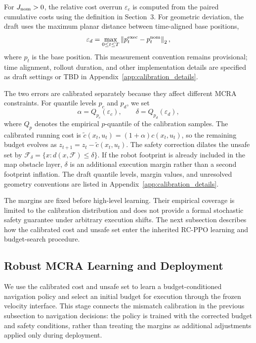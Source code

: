 \documentclass{article}
\begin{document}
For $J_{\rm nom}>0$, the relative cost overrun $\varepsilon_c$ is computed from
the paired cumulative costs using the definition in Section~3. For geometric
deviation, the draft uses the maximum planar distance between time-aligned base
positions,
\begin{equation}
\varepsilon_d=\max_{0\leq t\leq T} \left\|p_t^{\rm exec}-p_t^{\rm nom}\right\|_2,
\end{equation}
where $p_t$ is the base position. This measurement convention remains provisional;
time alignment, rollout duration, and other implementation details are specified
as draft settings or \textsc{TBD} in Appendix~\ref{app:calibration_details}.

The two errors are calibrated separately because they affect different MCRA
constraints. For quantile levels $p_c$ and $p_d$, we set
\begin{equation}
\alpha=Q_{p_c}(\varepsilon_c),\qquad
\delta=Q_{p_d}(\varepsilon_d),
\end{equation}
where $Q_p$ denotes the empirical $p$-quantile of the calibration samples. The
calibrated running cost is
$\tilde c(x_t,u_t)=(1+\alpha)c(x_t,u_t)$, so the remaining budget evolves as
$z_{t+1}=z_t-\tilde c(x_t,u_t)$. The safety correction dilates the unsafe set by
$\mathcal{F}_\delta=\{x:d(x,\mathcal{F})\leq\delta\}$. If the robot footprint is
already included in the map obstacle layer, $\delta$ is an additional execution
margin rather than a second footprint inflation. The draft quantile levels,
margin values, and unresolved geometry conventions are listed in
Appendix~\ref{app:calibration_details}.

The margins are fixed before high-level learning. Their empirical coverage is
limited to the calibration distribution and does not provide a formal stochastic
safety guarantee under arbitrary execution shifts. The next subsection describes
how the calibrated cost and unsafe set enter the inherited RC-PPO learning and
budget-search procedure.

\subsection{Robust MCRA Learning and Deployment}
We use the calibrated cost and unsafe set to learn a budget-conditioned navigation
policy and select an initial budget for execution through the frozen velocity
interface. This stage connects the mismatch calibration in the previous subsection
to navigation decisions: the policy is trained with the corrected budget and safety
conditions, rather than treating the margins as additional adjustments applied only
during deployment.
\end{document}
